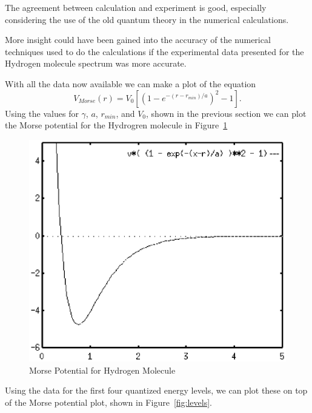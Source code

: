 \documentclass[a4paper]{IEEEtran}
\begin{document}
      The agreement between calculation and experiment is good,
      especially considering the use of the old quantum theory in the
      numerical calculations.

      More insight could have been gained into the accuracy of the
      numerical techniques used to do the calculations if the
      experimental data presented for the Hydrogen molecule spectrum was
      more accurate.

      With all the data now available we can make a plot of the equation
      \[ V_{Morse}(r) = V_0\left[\left(1-e^{-(r-r_{min})/a}\right)^2 - 1\right]. \]
      Using the values for $\gamma$, $a$, $r_{min}$, and $V_0$, shown in
      the previous section we can plot the Morse potential for the
      Hydrogren molecule in Figure~\ref{fig:morse} 

        \begin{figure}
        \centering
        \includegraphics[width=0.8\columnwidth]{morse.eps}
        \caption{Morse Potential for Hydrogen Molecule} 
        \label{fig:morse} 
        \end{figure} 


      Using the data for the first four quantized energy levels, we can
      plot these on top of the Morse potential plot, shown in 
      Figure~\ref{fig:levels}. 
\end{document}
